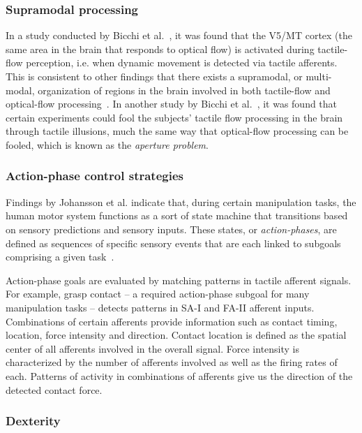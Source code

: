 \subsubsection*{Supramodal processing}

In a study conducted by Bicchi et al.~\cite{scilingo2004perception}, it was found that the V5/MT cortex (the same area in the brain that responds to optical flow) is activated during tactile-flow perception, i.e. when dynamic movement is detected via tactile afferents.
This is consistent to other findings that there exists a supramodal, or multi-modal, organization of regions in the brain involved in both tactile-flow and optical-flow processing~\cite{flanagan2006control}.
In another study by Bicchi et al.~\cite{bicchi2003haptic}, it was found that certain experiments could fool the subjects' tactile flow processing in the brain through tactile illusions, much the same way that optical-flow processing can be fooled, which is known as the \emph{aperture problem}.

\subsubsection*{Action-phase control strategies}

Findings by Johansson et al. indicate that, during certain manipulation tasks, the human motor system functions as a sort of state machine that transitions based on sensory predictions and sensory inputs.
These states, or \emph{action-phases}, are defined as sequences of specific sensory events that are each linked to subgoals comprising a given task~\cite{johansson2009coding}.

Action-phase goals are evaluated by matching patterns in tactile afferent signals.
For example, grasp contact – a required action-phase subgoal for many manipulation tasks – detects patterns in SA-I and FA-II afferent inputs.
Combinations of certain afferents provide information such as contact timing, location, force intensity and direction.
Contact location is defined as the spatial center of all afferents involved in the overall signal.
Force intensity is characterized by the number of afferents involved as well as the firing rates of each.
Patterns of activity in combinations of afferents give us the direction of the detected contact force.

\subsubsection*{Dexterity}

